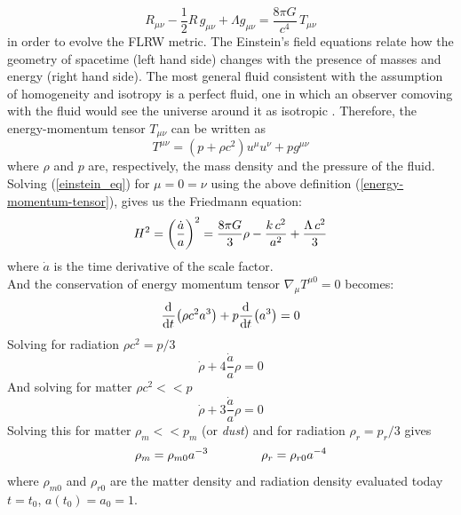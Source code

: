 \documentclass{article}
\newcommand{\beq}{\begin{equation}}
\newcommand{\eeq}{\end{equation}}
\begin{document}
\begin{equation}
\label{einstein_eq}
R_{\mu \nu} - \dfrac{1}{2} R \, g _{\mu \nu} + \Lambda g_{\mu \nu}= \dfrac{8 \pi G}{c^4} \, T_{\mu \nu}
\end{equation}
in order to evolve the FLRW metric.
The Einstein's field equations relate how the geometry of spacetime (left hand side) changes with the presence of masses and energy (right hand side).
The most general fluid consistent with the assumption of homogeneity and isotropy is a perfect fluid, one in which an observer comoving with the fluid would see the universe around it as isotropic \citep{garcia-bellidoAstrophysicsCosmology2000}. Therefore, the energy-momentum tensor $T_{\mu \nu}$ can be written as
\begin{equation}
\label{energy-momentum-tensor}
T^{\mu \nu } = (p + \rho c^2)u ^{\mu} u^{\nu}+p g^{\mu \nu} 
\end{equation}
where $\rho$ and $p$ are, respectively, the mass density and the pressure of the fluid.\\
Solving (\ref{einstein_eq}) for $\mu= 0=\nu$ using the above definition (\ref{energy-momentum-tensor}), gives us the Friedmann equation:
\begin{equation}
\label{firedmann_eq}
\begin{split}
H^2 = \qty(\frac{\dot{a}}{a})^2 = \dfrac{8 \pi G}{3} \rho -\dfrac{k \, c^2}{a^2} + \frac{\Lambda \, c^2}{3}
\end{split}
\end{equation}
where $\dot{a}$ is the time derivative of the scale factor.\\
And the conservation of energy momentum tensor $\nabla_\mu T^{\mu 0} =0 $ becomes:
\beq
\label{energy_cons}
\dv[]{}{t}\qty(\rho c^2 a^3) + p \dv[]{}{t} \qty(a^3)  = 0
\eeq
Solving for radiation $\rho c^2 = p/3$
\[
\dot{\rho}  + 4 \frac{ \dot{a}}{a} \rho =0
\]
 And solving for matter $\rho c^2 << p$
 \[
 \dot{\rho}  + 3 \frac{ \dot{a}}{a} \rho =0
 \]
Solving this for matter $\rho_m << p_m$ (or \emph{dust}) and for radiation $\rho_r = p_r/3$ gives
\begin{equation}
\begin{split}
\rho_m = \rho_{m 0} a^{-3} \hspace{1.5cm} \rho_r = \rho_{r 0} a^{-4} \notag
\end{split}
\end{equation}
where $\rho_{m 0}$ and $\rho_{r 0}$ are the matter density and radiation density evaluated today $t = t_0$, $a(t_0) = a_0 =1$.\\
\end{document}
